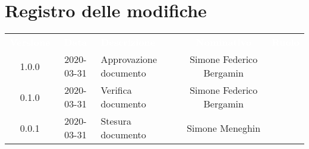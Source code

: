 \section*{Registro delle modifiche}
{
	\centering
	\begin{longtable}{ c c  C{4cm}  c  c }
		\textcolor{white}{\textbf{Versione}} & \textcolor{white}{\textbf{Data}} & \textcolor{white}{\textbf{Descrizione}} & \textcolor{white}{\textbf{Nominativo}} & \textcolor{white}{\textbf{Ruolo}}\\		
		1.0.0 & 2020-03-31 & Approvazione documento & Simone Federico Bergamin &\RdP{}\\		
		0.1.0 & 2020-03-31 & Verifica documento & Simone Federico Bergamin &\ver{}\\		
		0.0.1 & 2020-03-31 & Stesura documento & Simone Meneghin &\reda{}\\		
		
	\end{longtable}

}